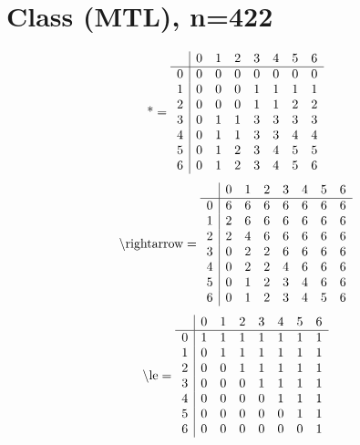 \documentclass[11pt]{article}
\begin{document}
\section{Class (MTL), n=422}
\[\text{*} = 
\begin{array}{r | r r r r r r r}
 & 0 & 1 & 2 & 3 & 4 & 5 & 6 \\ \hline
0 & 0 & 0 & 0 & 0 & 0 & 0 & 0 \\
1 & 0 & 0 & 0 & 1 & 1 & 1 & 1 \\
2 & 0 & 0 & 0 & 1 & 1 & 2 & 2 \\
3 & 0 & 1 & 1 & 3 & 3 & 3 & 3 \\
4 & 0 & 1 & 1 & 3 & 3 & 4 & 4 \\
5 & 0 & 1 & 2 & 3 & 4 & 5 & 5 \\
6 & 0 & 1 & 2 & 3 & 4 & 5 & 6 \\
\end{array}
\]
\[\text{\textbackslash rightarrow} = 
\begin{array}{r | r r r r r r r}
 & 0 & 1 & 2 & 3 & 4 & 5 & 6 \\ \hline
0 & 6 & 6 & 6 & 6 & 6 & 6 & 6 \\
1 & 2 & 6 & 6 & 6 & 6 & 6 & 6 \\
2 & 2 & 4 & 6 & 6 & 6 & 6 & 6 \\
3 & 0 & 2 & 2 & 6 & 6 & 6 & 6 \\
4 & 0 & 2 & 2 & 4 & 6 & 6 & 6 \\
5 & 0 & 1 & 2 & 3 & 4 & 6 & 6 \\
6 & 0 & 1 & 2 & 3 & 4 & 5 & 6 \\
\end{array}
\]
\[\text{\textbackslash le} = 
\begin{array}{r | r r r r r r r}
 & 0 & 1 & 2 & 3 & 4 & 5 & 6 \\ \hline
0 & 1 & 1 & 1 & 1 & 1 & 1 & 1 \\
1 & 0 & 1 & 1 & 1 & 1 & 1 & 1 \\
2 & 0 & 0 & 1 & 1 & 1 & 1 & 1 \\
3 & 0 & 0 & 0 & 1 & 1 & 1 & 1 \\
4 & 0 & 0 & 0 & 0 & 1 & 1 & 1 \\
5 & 0 & 0 & 0 & 0 & 0 & 1 & 1 \\
6 & 0 & 0 & 0 & 0 & 0 & 0 & 1 \\
\end{array}
\]
\end{document}

